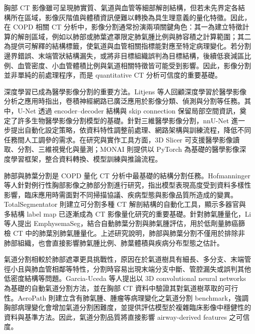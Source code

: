 \begin{ZhChapter}
胸部 CT 影像雖可呈現肺實質、氣道與血管等細部解剖結構，但若未先界定各結構所在區域，影像灰階值與體積資訊便難以轉換為具生理意義的量化特徵。因此，在 COPD 相關 CT 分析中，影像分割通常扮演兩項關鍵角色：其一為建立特徵計算的解剖區域，例如以肺部或肺葉遮罩限定肺氣腫比例與肺容積之計算範圍；其二為提供可解釋的結構標籤，使氣道與血管相關指標能對應至特定病理變化。若分割邊界錯誤、末端管狀結構漏失，或將非目標組織誤判為目標結構，後續低衰減區比例、血管密度、小血管體積比例與氣道相關特徵皆可能受到影響。因此，影像分割並非單純的前處理程序，而是 quantitative CT 分析可信度的重要基礎。

深度學習已成為醫學影像分割的重要方法。Litjens 等人回顧深度學習於醫學影像分析之應用時指出，卷積神經網路已廣泛應用於影像分類、偵測與分割等任務\cite{litjens2017survey}。其中，U-Net 透過 encoder--decoder 結構與 skip connection 保留局部空間資訊，奠定了許多生物醫學影像分割模型的基礎\cite{ronneberger2015unet}。針對三維醫學影像分割，nnU-Net 進一步提出自動化設定策略，依資料特性調整前處理、網路架構與訓練流程，降低不同任務間人工調參的需求\cite{isensee2021nnunet}。在研究與實作工具方面，3D Slicer 可支援醫學影像讀取、分割、三維視覺化與量測\cite{fedorov2012slicer}；MONAI 則提供以 PyTorch 為基礎的醫學影像深度學習框架，整合資料轉換、模型訓練與推論流程\cite{cardoso2022monai}。

肺部與肺葉分割是 COPD 量化 CT 分析中最基礎的結構分割任務。Hofmanninger 等人針對例行性胸部影像之肺部分割進行研究，指出模型表現高度受到資料多樣性影響，臨床應用時需面對不同掃描協議、疾病型態與影像品質所造成的變異\cite{hofmanninger2020lungmask}。TotalSegmentator 則建立可分割多種 CT 解剖結構的自動化工具，顯示多器官與多結構 label map 已逐漸成為 CT 影像量化研究的重要基礎\cite{wasserthal2023totalsegmentator}。針對肺氣腫量化，Li 等人提出 EmphysemaSeg，結合自動肺葉分割與肺氣腫評估，用於低劑量肺癌篩檢 CT 中的肺葉別肺氣腫量化\cite{li2023emphysemaseg}。上述研究說明，肺部與肺葉分割不僅用於排除非肺部組織，也會直接影響肺氣腫比例、肺葉體積與疾病分布型態之估計。

氣道分割相較於肺部遮罩更具挑戰性，原因在於氣道樹具有細長、多分支、末端管徑小且與肺血管相鄰等特性，分割時容易出現末端分支中斷、管腔漏失或誤判其他低密度結構等問題。Garcia-Uceda 等人提出以 3D convolutional neural networks 為基礎的自動氣道分割方法，並在胸部 CT 資料中驗證其對氣道樹萃取的可行性\cite{garciauceda2021bronchinet}。AeroPath 則建立含有肺氣腫、腫瘤等病理變化之氣道分割 benchmark，強調胸部病理變化會增加氣道分割困難度，並提供評估模型於複雜臨床影像中穩健性的資料與基準方法\cite{stoverud2024aeropath}。因此，氣道分割品質將直接影響 airway-derived features 之可信度。


\end{ZhChapter}
